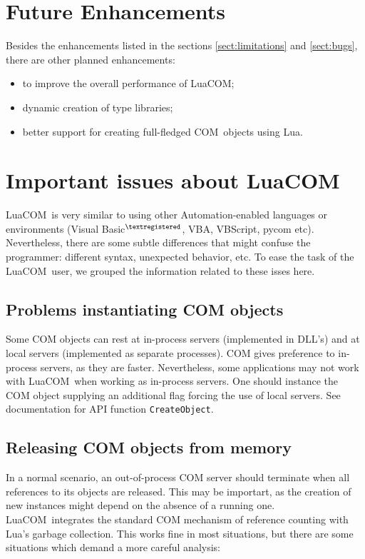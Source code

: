 \documentclass[11pt,a4paper,english]{report}
\newcommand{\ident}[1]{\mbox{\texttt{#1}}}
\newcommand{\techname}[1]{\mbox{#1}}
\newcommand{\lua}{\techname{Lua}}
\newcommand{\com}{\techname{COM}}
\newcommand{\luacom}{\techname{LuaCOM}}
\newcommand{\registered}{$^{\textregistered}$}
\begin{document}
\section{Future Enhancements}
\label{sect:enhancements}

Besides the enhancements listed in the sections \ref{sect:limitations} and
\ref{sect:bugs}, there are other planned enhancements:

\begin{itemize}
\item to improve the overall performance of \luacom;
\item dynamic creation of type libraries;
\item better support for creating full-fledged \com\ objects using \lua.
\end{itemize}


\section{Important issues about \luacom}

\luacom\ is very similar to using other Automation-enabled languages
or environments (Visual Basic\registered, VBA, VBScript\texttrademark,
pycom etc). Nevertheless, there are some subtle differences that might
confuse the programmer: different syntax, unexpected behavior, etc. To
ease the task of the \luacom\ user, we grouped the information related
to these isses here.

\subsection{Problems instantiating COM objects}
Some COM objects can rest at in-process servers (implemented in DLL's)
and at local servers (implemented as separate processes). COM gives
preference to in-process servers, as they are faster. Nevertheless,
some applications may not work with \luacom\ when working as
in-process servers. One should instance the COM object supplying an
additional flag forcing the use of local servers. See documentation
for API function \ident{CreateObject}.

\subsection{Releasing COM objects from memory}
In a normal scenario, an out-of-process COM server should terminate
when all references to its objects are released. This may be
importart, as the creation of new instances might depend on the
absence of a running one. \luacom\ integrates the standard COM
mechanism of reference counting with Lua's garbage collection. This
works fine in most situations, but there are some situations which
demand a more careful analysis:
\end{document}
